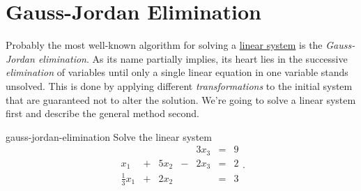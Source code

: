 \section{Gauss-Jordan Elimination}
\label{sec:gauss-jordan-elimination}

Probably the most well-known algorithm for solving a
\hyperref[def:linear-system]{linear system} is the \emph{Gauss-Jordan
elimination}. As its name partially implies, its heart lies in the successive
\emph{elimination} of variables until only a single linear equation in one
variable stands unsolved. This is done by applying different
\emph{transformations} to the initial system that are guaranteed not to alter
the solution. We're going to solve a linear system first and describe the
general method second.

\begin{problem}{}{gauss-jordan-elimination}
 Solve the linear system
 \[
  \begin{array}{rcrcrcr}
   & & & & 3x_3 & = & 9\\
   x_1 & + & 5x_2 & - & 2x_3 & = & 2\\
   \frac{1}{3}x_1 & + & 2x_2 & & & = & 3
  \end{array}.
 \]
\end{problem}
